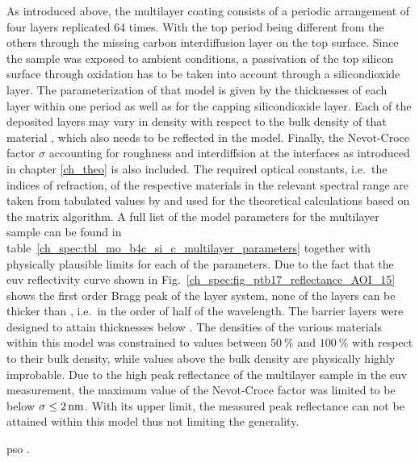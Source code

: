 As introduced above, the multilayer coating consists of a periodic arrangement of four layers replicated 64 times. With the top period being different from the others through the missing carbon interdiffusion layer on the top surface. Since the sample was exposed to ambient conditions, a passivation of the top silicon surface through oxidation has to be taken into account through a silicondioxide layer. The parameterization of that model is given by the thicknesses of each layer within one period as well as for the capping silicondioxide layer. Each of the deposited layers may vary in density with respect to the bulk density of that material \cite{braun_mo/si_2002}, which also needs to be reflected in the model. Finally, the Nevot-Croce factor $\sigma$ accounting for roughness and interdiffsion at the interfaces as introduced in chapter \ref{ch_theo} is also included. The required optical constants, i.e.~the indices of refraction, of the respective materials in the relevant spectral range are taken from tabulated values by \textcite{henke_x-ray_1993} and used for the theoretical calculations based on the matrix algorithm. A full list of the model parameters for the multilayer sample can be found in table~\ref{ch_spec:tbl_mo_b4c_si_c_multilayer_parameters} together with physically plausible limits for each of the parameters. Due to the fact that the \gls{euv} reflectivity curve shown in Fig.~\ref{ch_spec:fig_ptb17_reflectance_AOI_15} shows the first order Bragg peak of the layer system, none of the layers can be thicker than , i.e.~in the order of half of the wavelength. The barrier layers were designed to attain thicknesses below . The densities of the various materials within this model was constrained to values between $\SI{50}{\percent}$ and $\SI{100}{\percent}$ with respect to their bulk density, while values above the bulk density are physically highly improbable. Due to the high peak reflectance of the multilayer sample in the \gls{euv} measurement, the maximum value of the Nevot-Croce factor was limited to be below $\sigma \leq \nm{2}$. With its upper limit, the measured peak reflectance can not be attained within this model thus not limiting the generality.

\gls{pso} \cite{kennedy_particle_2011}.

